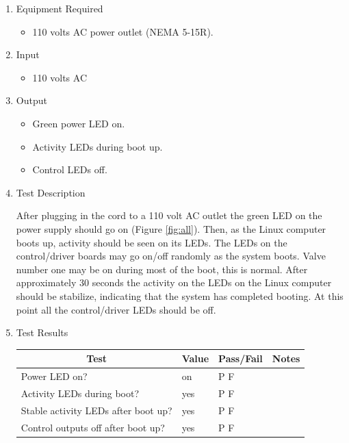 \documentclass{article}
\begin{document}
\begin{enumerate}
\item Equipment Required
	\begin{itemize}
		\item 110 volts AC power outlet (NEMA 5-15R).
	\end{itemize}
\item Input
	\begin{itemize}
	\item 110 volts AC
	\end{itemize}
\item Output
	\begin{itemize}
	\item Green power LED on.
	\item Activity LEDs during boot up.
	\item Control LEDs off.
	\end{itemize}
\item Test Description \\
\vspace{0.5em}

After plugging in the cord to a 110 volt AC outlet the green LED on
the power supply should go on (Figure \ref{fig:all}).
Then, as the Linux computer boots up, activity should be seen on its LEDs.
The LEDs on the control/driver boards may go on/off randomly as the
system boots.  Valve number one may be on during most of the boot,
this is normal.
After approximately 30 seconds the activity on the LEDs on the Linux
computer should be stabilize, indicating that the system has completed booting.
At this point all the control/driver LEDs should be off.

\item Test Results \\
\vspace{1em}
\begin{tabular}{|l|l|l|l|}
	\hline
	\multicolumn{1}{|c|}{Test}
	& \multicolumn{1}{|c|}{Value}
	& \multicolumn{1}{|c|}{Pass/Fail}
	& \multicolumn{1}{|c|}{Notes} \\
	\hline
	Power LED on? & on & P \quad F & \hspace{1.7in} \\
	\hline
	Activity LEDs during boot? & yes & P \quad F & \\
	\hline
	Stable activity LEDs after boot up? & yes & P \quad F & \\
	\hline
	Control outputs off after boot up? & yes & P \quad F & \\
	\hline
\end{tabular}

\end{enumerate}
\end{document}
